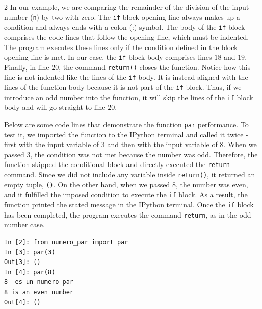 \begin{paracol}{2}
In our example, we are comparing the remainder of the division of the input number (\texttt{n}) by two with zero. The \texttt{if} block opening line always makes up a condition and always ends with a colon (:) symbol. The body of the \texttt{if} block comprises the code lines that follow the opening line, which must be indented. The program executes these lines only if the condition defined in the block opening line is met. In our case, the \texttt{if} block body comprises lines $18$ and $19$. Finally, in line $20$, the command \texttt{return()} closes the function. Notice how this line is not indented like the lines of the \texttt{if} body. It is instead aligned with the lines of the function body because it is not part of the \texttt{if} block. Thus, if we introduce an odd number into the function, it will skip the lines of the \texttt{if}
block body and will go straight to line $20$.

Below are some code lines that demonstrate the function  \texttt{par} performance. To test it, we imported the function to the IPython terminal and called it twice - first with the input variable of 3 and then with the input variable of 8. When we passed 3, the condition was not met because the number was odd. Therefore, the function skipped the conditional block and directly executed the \texttt{return} command. Since we did not include any variable inside \texttt{return()}, it returned an empty tuple, \texttt{()}.
On the other hand, when we passed 8, the number was even, and it fulfilled the imposed condition to execute the \texttt{if} block. As a result, the function printed the stated message in the IPython terminal. Once the \texttt{if} block has been completed, the program executes the command \texttt{return}, as in the odd number case.

\end{paracol}

\begin{center}
    \begin{minipage}{.4\textwidth}
\begin{verbatim}
In [2]: from numero_par import par
In [3]: par(3)
Out[3]: ()
In [4]: par(8)
8  es un numero par
8 is an even number
Out[4]: ()
\end{verbatim}
\end{minipage}
\end{center}

